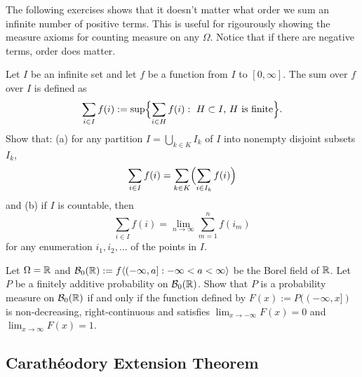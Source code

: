 The following exercises shows that it doesn't matter what order we sum an infinite number of positive terms. This is useful for rigourously showing the measure axioms for counting measure on any $\Omega$. Notice that if there are negative terms, order does matter.
\begin{exercise}
Let $I$ be an infinite set and let $f$ be a function from $I$ to $[0,\infty]$. The sum over $f$ over $I$ is defined as
\[ \sum_{i\in I} f(i):=\sup\Bigl\{ \sum_{i\in H} f(i): \text{ $H\subset I$, $H$ is finite}  \Bigr\}. \]
Show that: (a) for any partition $I = \bigcup_{k\in K} I_k$ of $I$ into nonempty disjoint subsets $I_k$,
\[  \sum_{i\in I} f(i) =  \sum_{k\in K}\Bigl(\sum_{i\in I_k} f(i)\Bigr) \]
and (b) if $I$ is countable, then
\[  \sum_{i\in I} f(i) = \lim_{n\rightarrow \infty} \sum_{m=1}^n f(i_m) \]
for any enumeration $i_1,i_2,\ldots$ of the points in $I$.
\end{exercise}





\begin{exercise}
Let $\Omega = \Bbb R$ and $\mathcal B_0(\Bbb R):= f\langle (-\infty,a]: -\infty < a <\infty  \rangle$ be the Borel field of $\Bbb R$. Let $P$ be a finitely additive probability on $\mathcal B_0(\Bbb R)$. Show that $P$ is a probability measure on  $\mathcal B_0(\Bbb R)$ if and only if the function defined by $F(x):= P((-\infty, x])$ is non-decreasing, right-continuous and satisfies $\lim_{x\rightarrow -\infty} F(x)=0$ and  $\lim_{x\rightarrow \infty} F(x)=1$.
\end{exercise}
%


\subsection{Carath\'eodory Extension Theorem}


